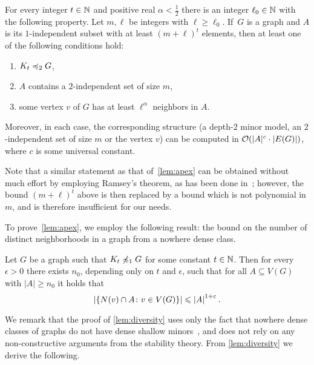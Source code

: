 \begin{lemma}\label{lem:apex}
For every integer $t\in \mathbb{N}$ and positive real $\alpha<\frac 1 2$ 
there is an integer $\ell_0\in\mathbb{N}$ with the following property.
Let $m,\ell$ be integers with $\ell\ge \ell_0$. 
If~$G$ is a graph and $A$ is its $1$-independent subset
with at least $(m+\ell)^{t}$ elements,
then at least one of the following conditions hold:
\begin{enumerate}
  \item $K_t\preccurlyeq_{2} G$,
\item  $A$ contains a $2$-independent set of size $m$, 
\item  some vertex $v$ of $G$
has at least $\ell^{\alpha}$ neighbors in $A$.
\end{enumerate}
Moreover, in each case, the corresponding structure (a depth-$2$ minor model, an $2$-independent set of size $m$ or the vertex $v$) can be computed in $\mathcal{O}(|A|^c\cdot |E(G)|)$, where $c$  is some universal constant.
\end{lemma}

Note that a similar statement as that of~\cref{lem:apex}
can be obtained without much effort by employing Ramsey's theorem, as has been done in~\cite{}; however, the bound $(m+\ell)^t$ above is then replaced by a bound which is not polynomial in $m$, and is therefore insufficient for our needs.

\medskip
To prove~\cref{lem:apex}, we employ the following result: the bound on the number of distinct neighborhoods in a graph from a nowhere dense class.

\begin{lemma}\label{lem:diversity}
Let $G$ be a graph such that $K_t\not\preccurlyeq_{1} G$ for some constant $t\in \mathbb{N}$. 
Then for every $\epsilon>0$ there exists $n_0$, depending only on $t$ and $\epsilon$, such that for all $A\subseteq V(G)$ with $|A|\geq n_0$ it holds that
\[\left\lvert\{N(v)\cap A \colon v\in V(G)\}\right\rvert\leqslant\left\lvert A\right\rvert^{1+\varepsilon}.\]
\end{lemma}



We remark that the proof of \cref{lem:diversity} uses only the fact that
nowhere dense classes of graphs do not have dense 
shallow minors~\cite{dvorak2007asymptotical,jiang2011compact}, and does not rely on any non-constructive arguments from the stability theory.
From \cref{lem:diversity} we derive the following.

